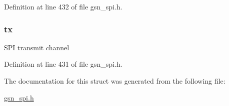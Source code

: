 Definition at line 432 of file gsn\_\-spi.h.

\hypertarget{a00239_a703033c527062b683f63ff1cd82fe5c2}{
\subsubsection[{tx}]{ {\bf tx}}}
\label{a00239_a703033c527062b683f63ff1cd82fe5c2}
SPI transmit channel 

Definition at line 431 of file gsn\_\-spi.h.



The documentation for this struct was generated from the following file:\begin{DoxyCompactItemize}
\item 
\hyperlink{a00587}{gsn\_\-spi.h}\end{DoxyCompactItemize}
